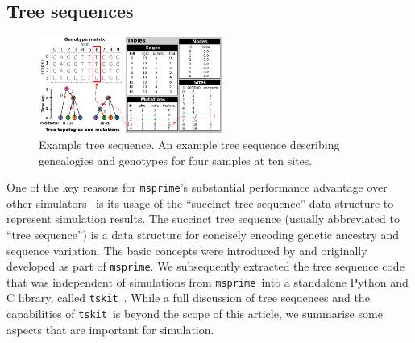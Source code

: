 \documentclass{article}
\newcommand{\msprime}[0]{\texttt{msprime}}
\newcommand{\tskit}[0]{\texttt{tskit}}
\begin{document}

\subsection*{Tree sequences}
\label{sec-ts}

\begin{figure}
\begin{center}
\includegraphics[width=6cm]{illustrations/example_tree_sequence}
\end{center}
\caption{\label{fig-ts-example} Example tree sequence.
An example tree sequence describing genealogies and genotypes
for four samples at ten sites.
}
\end{figure}

One of the key reasons for \msprime's substantial performance advantage
over other simulators~\citep{kelleher2016efficient}
is its usage of the ``succinct tree sequence''
 data structure to represent simulation results.
The succinct tree sequence (usually abbreviated to ``tree sequence'')
is a data structure for concisely encoding
genetic ancestry and sequence variation.
The basic concepts were introduced by \cite{kelleher2016efficient}
and originally developed as part of \msprime. We subsequently
extracted the tree sequence code that was independent of simulations
from \msprime\ into
a standalone Python and C library, called \tskit~\citep{tskit2021tskit}.
While a full discussion of tree sequences and the capabilities
of \tskit\ is beyond the scope of this article, we summarise
some aspects that are important for simulation.
\end{document}
